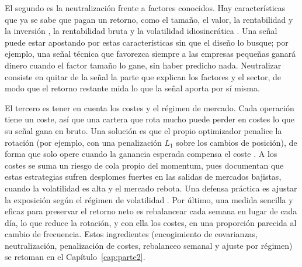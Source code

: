 El segundo es la neutralización frente a factores conocidos. Hay características que ya se
sabe que pagan un retorno, como el tamaño, el valor, la rentabilidad y la inversión
\autocite{famafrench2015five}, la rentabilidad bruta \autocite{novymarx2013other} y la
volatilidad idiosincrática \autocite{ang2006cross}. Una señal puede estar apostando por
estas características sin que el diseño lo busque; por ejemplo, una señal técnica que
favorezca siempre a las empresas pequeñas ganará dinero cuando el factor tamaño lo gane,
sin haber predicho nada. Neutralizar consiste en quitar de la señal la parte que explican
los factores y el sector, de modo que el retorno restante mida lo que la señal aporta por
sí misma.

El tercero es tener en cuenta los costes y el régimen de mercado. Cada operación tiene un
coste, así que una cartera que rota mucho puede perder en costes lo que su señal gana en
bruto. Una solución es que el propio optimizador penalice la rotación (por ejemplo, con
una penalización $L_1$ sobre los cambios de posición), de forma que solo opere cuando la
ganancia esperada compensa el coste \autocite{garleanu2013dynamic}. A los costes se suma
un riesgo de cola propio del momentum, pues \textcite{danielmoskowitz2016momentum} documentan
que estas estrategias sufren desplomes fuertes en las salidas de mercados bajistas, cuando
la volatilidad es alta y el mercado rebota. Una defensa práctica es ajustar la exposición
según el régimen de volatilidad \autocite{barroso2015momentum}. Por último, una medida
sencilla y eficaz para preservar el retorno neto es rebalancear cada semana en lugar de
cada día, lo que reduce la rotación, y con ella los costes, en una proporción parecida al
cambio de frecuencia. Estos ingredientes (encogimiento de covarianzas, neutralización,
penalización de costes, rebalanceo semanal y ajuste por régimen) se retoman en el
Capítulo~\ref{cap:parte2}.
